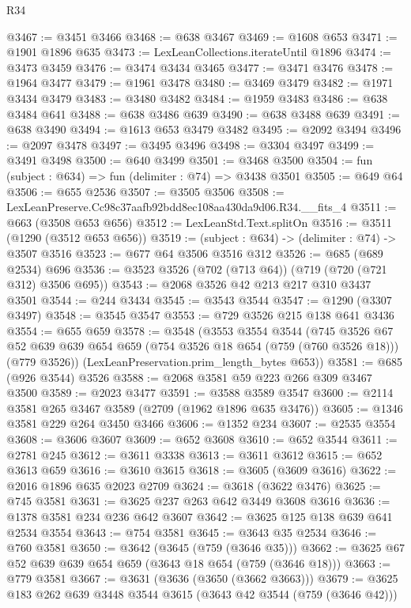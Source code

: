 \begin{lexlean}{R34}
\begin{coremodule}
@3467 := @3451 @3466
@3468 := @638 @3467
@3469 := @1608 @653
@3471 := @1901 @1896 @635
@3473 := LexLeanCollections.iterateUntil @1896
@3474 := @3473 @3459
@3476 := @3474 @3434 @3465
@3477 := @3471 @3476
@3478 := @1964 @3477
@3479 := @1961 @3478
@3480 := @3469 @3479
@3482 := @1971 @3434 @3479
@3483 := @3480 @3482
@3484 := @1959 @3483
@3486 := @638 @3484 @641
@3488 := @638 @3486 @639
@3490 := @638 @3488 @639
@3491 := @638 @3490
@3494 := @1613 @653 @3479 @3482
@3495 := @2092 @3494
@3496 := @2097 @3478
@3497 := @3495 @3496
@3498 := @3304 @3497
@3499 := @3491 @3498
@3500 := @640 @3499
@3501 := @3468 @3500
@3504 := fun (subject : @634) => fun (delimiter : @74) => @3438 @3501
@3505 := @649 @64
@3506 := @655 @2536
@3507 := @3505 @3506
@3508 := LexLeanPreserve.Cc98c37aafb92bdd8ec108aa430da9d06.R34.__fits_4
@3511 := @663 (@3508 @653 @656)
@3512 := LexLeanStd.Text.splitOn
@3516 := @3511 (@1290 (@3512 @653 @656))
@3519 := (subject : @634) -> (delimiter : @74) -> @3507 @3516
@3523 := @677 @64 @3506 @3516 @312
@3526 := @685 (@689 @2534) @696
@3536 := @3523 @3526 (@702 (@713 @64)) (@719 (@720 (@721 @312) @3506 @695))
@3543 := @2068 @3526 @42 @213 @217 @310 @3437 @3501
@3544 := @244 @3434
@3545 := @3543 @3544
@3547 := @1290 (@3307 @3497)
@3548 := @3545 @3547
@3553 := @729 @3526 @215 @138 @641 @3436
@3554 := @655 @659
@3578 := @3548
    (@3553
      @3554
      @3544
      (@745
        @3526
        @67
        @52
        @639
        @639
        @654
        @659
        (@754 @3526 @18 @654 (@759 (@760 @3526 @18)))
        (@779 @3526))
      (LexLeanPreservation.prim_length_bytes @653))
@3581 := @685 (@926 @3544) @3526
@3588 := @2068 @3581 @59 @223 @266 @309 @3467 @3500
@3589 := @2023 @3477
@3591 := @3588 @3589 @3547
@3600 := @2114 @3581 @265 @3467 @3589 (@2709 (@1962 @1896 @635 @3476))
@3605 := @1346 @3581 @229 @264 @3450 @3466
@3606 := @1352 @234
@3607 := @2535 @3554
@3608 := @3606 @3607
@3609 := @652 @3608
@3610 := @652 @3544
@3611 := @2781 @245
@3612 := @3611 @3338
@3613 := @3611 @3612
@3615 := @652 @3613 @659
@3616 := @3610 @3615
@3618 := @3605 (@3609 @3616)
@3622 := @2016 @1896 @635 @2023 @2709
@3624 := @3618 (@3622 @3476)
@3625 := @745 @3581
@3631 := @3625 @237 @263 @642 @3449 @3608 @3616
@3636 := @1378 @3581 @234 @236 @642 @3607
@3642 := @3625 @125 @138 @639 @641 @2534 @3554
@3643 := @754 @3581
@3645 := @3643 @35 @2534
@3646 := @760 @3581
@3650 := @3642 (@3645 (@759 (@3646 @35)))
@3662 := @3625 @67 @52 @639 @639 @654 @659 (@3643 @18 @654 (@759 (@3646 @18)))
@3663 := @779 @3581
@3667 := @3631 (@3636 (@3650 (@3662 @3663)))
@3679 := @3625 @183 @262 @639 @3448 @3544 @3615 (@3643 @42 @3544 (@759 (@3646 @42)))

\end{coremodule}
\end{lexlean}
